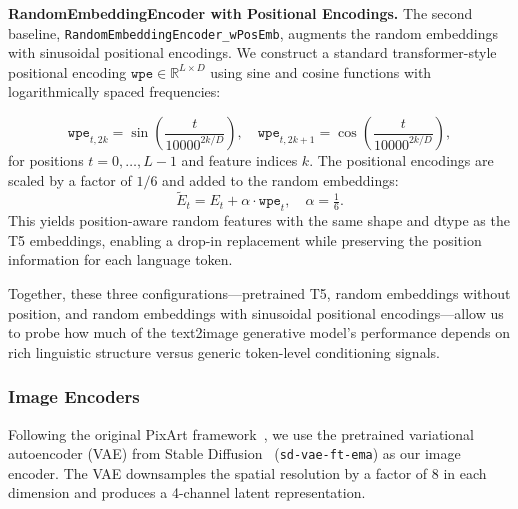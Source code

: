 \begin{sloppypar}
\textbf{RandomEmbeddingEncoder with Positional Encodings.}
The second baseline, \texttt{RandomEmbeddingEncoder\_wPosEmb}, augments the random embeddings with sinusoidal positional encodings. We construct a standard transformer-style positional encoding
$\texttt{wpe} \in \mathbb{R}^{L \times D}$
using sine and cosine functions with logarithmically spaced frequencies:
\end{sloppypar}
\[
\texttt{wpe}_{t,2k} = \sin\left(\frac{t}{10000^{2k/D}}\right), \quad
\texttt{wpe}_{t,2k+1} = \cos\left(\frac{t}{10000^{2k/D}}\right),
\]
for positions $t=0,\ldots,L-1$ and feature indices $k$. The positional encodings are scaled by a factor of $1/6$ and added to the random embeddings:
\[
\tilde{E}_t = E_t + \alpha \cdot \texttt{wpe}_t,\quad \alpha = \tfrac{1}{6}.
\]
This yields position-aware random features with the same shape and dtype as the T5 embeddings, enabling a drop-in replacement while preserving the position information for each language token.


Together, these three configurations---pretrained T5, random embeddings without position, and random embeddings with sinusoidal positional encodings---allow us to probe how much of the text2image generative model’s performance depends on rich linguistic structure versus generic token-level conditioning signals.

\subsubsection{Image Encoders}
\begin{sloppypar}
Following the original PixArt framework~\cite{chen2023PixArtAlpha}, we use the pretrained variational autoencoder (VAE) from Stable Diffusion~\cite{rombach2022latentdiff} (\texttt{sd-vae-ft-ema}) as our image encoder. The VAE downsamples the spatial resolution by a factor of $8$ in each dimension and produces a 4-channel latent representation. %
\end{sloppypar}

